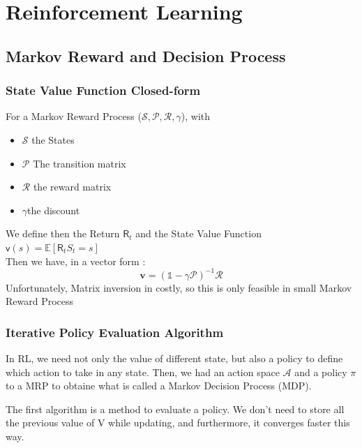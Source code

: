 
\chapter{Reinforcement Learning} %
	\label{cha:reinforcement_learning}


\section{Markov Reward and Decision Process} %
	\label{sec:markov_reward_and_decision_process}

	\subsection{State Value Function Closed-form} %
		\label{sub:state_value_function}
		
		For a Markov Reward Process ($\mathcal{S}, \mathcal{P}, \mathcal{R}, \gamma$), with 
		\begin{itemize}
			\item $\mathcal{S}$ the States
			\item $\mathcal{P}$ The transition matrix
			\item $\mathcal{R}$ the reward matrix
			\item $ \gamma $the discount
		\end{itemize}

		We define then the Return $\mathsf R_t$ and the State Value Function
		$\mathsf v (s) = \mathbb{E}[\mathsf R_t  S_t = s]$\\
		Then we have, in a vector form : 
		\[
			\mathbf{v} = (\mathbb{1} - \gamma \mathcal P )^{-1} \mathcal{R}
		\]
		Unfortunately, Matrix inversion in costly, so this is only feasible in small Markov Reward Process

	\subsection{Iterative Policy Evaluation Algorithm} %
		\label{sub:iterative_policy_evaluation_algorithm}

		In RL, we need not only the value of different state, but also a policy to define which action to take in any state. Then, we had an action space $\mathcal{A}$ and a policy $\pi$ to a MRP to obtaine what is called a Markov Decision Process	(MDP).

		The first algorithm is a method to evaluate a policy. We don't need to store all the previous value of V while updating, and furthermore, it converges faster this way.

